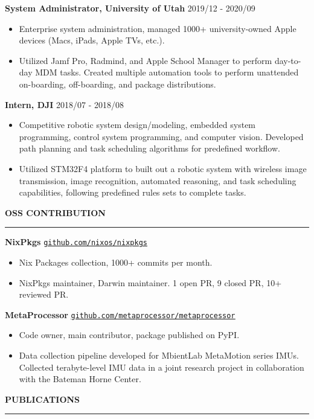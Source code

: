 \documentclass{letter}
\newcommand{\link}[2]{
\href{#1}{\underline{\texttt{#2}}}
}
\newcommand{\section}[1]{
\Large{\textbf{\MakeUppercase{#1}}}

\vspace{-0.3in}
\rule{\textwidth}{0.25mm}
\vspace{-0.35in}
}
\newcommand{\experience}[3]{
\large{\textbf{#1} \hfill \normalsize{#2}}

\vspace{-2.5mm}

\normalsize{#3}

\vspace{-2.5mm}
}
\begin{document}
\experience{System Administrator, University of Utah}{2019/12 - 2020/09} {
\begin{itemize}
\item Enterprise system administration, managed 1000+ university-owned Apple devices (Macs, iPads, Apple TVs, etc.).
\item Utilized Jamf Pro, Radmind, and Apple School Manager to perform day-to-day MDM tasks. Created multiple automation tools to perform unattended on-boarding, off-boarding, and package distributions.
\end{itemize}
}

\experience{Intern, DJI}{2018/07 - 2018/08} {
\begin{itemize}
\item Competitive robotic system design/modeling, embedded system programming, control system programming, and computer vision. Developed path planning and task scheduling algorithms for predefined workflow.
\item Utilized STM32F4 platform to built out a robotic system with wireless image transmission, image recognition, automated reasoning, and task scheduling capabilities, following predefined rules sets to complete tasks.
\end{itemize}
}

\section{OSS Contribution}

\experience{NixPkgs}
{\link{https://github.com/nixos/nixpkgs}{github.com/nixos/nixpkgs}} {
\begin{itemize}
\item Nix Packages collection, 1000+ commits per month.
\item NixPkgs maintainer, Darwin maintainer. 1 open PR, 9 closed PR, 10+ reviewed PR.
\end{itemize}
}

\experience{MetaProcessor}
{\link{https://github.com/metaprocessor/metaprocessor}{github.com/metaprocessor/metaprocessor}} {
\begin{itemize}
\item Code owner, main contributor, package published on PyPI.
\item Data collection pipeline developed for MbientLab MetaMotion series IMUs. Collected terabyte-level IMU data in a joint research project in collaboration with the Bateman Horne Center. 
\end{itemize}
}

\section{Publications}

\normalsize{
\nocite{*}


}
\end{document}
